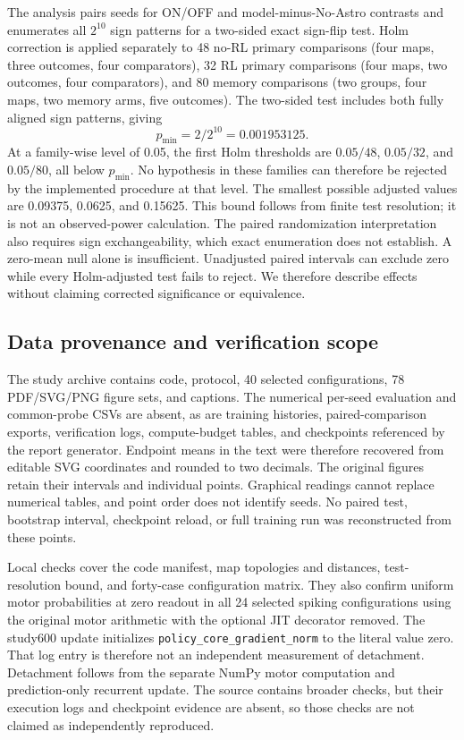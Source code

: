The analysis pairs seeds for ON/OFF and model-minus-No-Astro contrasts and enumerates all $2^{10}$ sign patterns for a two-sided exact sign-flip test. Holm correction is applied separately to 48 no-RL primary comparisons (four maps, three outcomes, four comparators), 32 RL primary comparisons (four maps, two outcomes, four comparators), and 80 memory comparisons (two groups, four maps, two memory arms, five outcomes). The two-sided test includes both fully aligned sign patterns, giving
\begin{equation}
 p_{\min}=2/2^{10}=0.001953125.
\end{equation}
At a family-wise level of 0.05, the first Holm thresholds are $0.05/48$, $0.05/32$, and $0.05/80$, all below $p_{\min}$. No hypothesis in these families can therefore be rejected by the implemented procedure at that level. The smallest possible adjusted values are 0.09375, 0.0625, and 0.15625. This bound follows from finite test resolution; it is not an observed-power calculation. The paired randomization interpretation also requires sign exchangeability, which exact enumeration does not establish. A zero-mean null alone is insufficient. Unadjusted paired intervals can exclude zero while every Holm-adjusted test fails to reject. We therefore describe effects without claiming corrected significance or equivalence.

\subsection{Data provenance and verification scope}\label{app:evidence}
The study archive contains code, protocol, 40 selected configurations, 78 PDF/SVG/PNG figure sets, and captions. The numerical per-seed evaluation and common-probe CSVs are absent, as are training histories, paired-comparison exports, verification logs, compute-budget tables, and checkpoints referenced by the report generator. Endpoint means in the text were therefore recovered from editable SVG coordinates and rounded to two decimals. The original figures retain their intervals and individual points. Graphical readings cannot replace numerical tables, and point order does not identify seeds. No paired test, bootstrap interval, checkpoint reload, or full training run was reconstructed from these points.

Local checks cover the code manifest, map topologies and distances, test-resolution bound, and forty-case configuration matrix. They also confirm uniform motor probabilities at zero readout in all 24 selected spiking configurations using the original motor arithmetic with the optional JIT decorator removed. The study600 update initializes \texttt{policy\_core\_gradient\_norm} to the literal value zero. That log entry is therefore not an independent measurement of detachment. Detachment follows from the separate NumPy motor computation and prediction-only recurrent update. The source contains broader checks, but their execution logs and checkpoint evidence are absent, so those checks are not claimed as independently reproduced.

